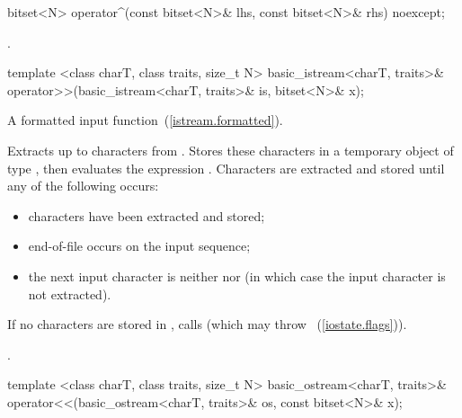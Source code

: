 %
\begin{itemdecl}
bitset<N> operator^(const bitset<N>& lhs, const bitset<N>& rhs) noexcept;
\end{itemdecl}

\begin{itemdescr}
\pnum
\returns
{}.
\end{itemdescr}

%
%
\begin{itemdecl}
template <class charT, class traits, size_t N>
  basic_istream<charT, traits>&
  operator>>(basic_istream<charT, traits>& is, bitset<N>& x);
\end{itemdecl}

\begin{itemdescr}
\pnum
A formatted input function~(\ref{istream.formatted}).

\pnum
\effects
Extracts up to  characters from .
Stores these characters in a temporary object  of type
,
then evaluates the expression
.
Characters are extracted and stored until any of the following occurs:

\begin{itemize}
\item
{} characters have been extracted and stored;
\item
end-of-file occurs on the input sequence;%
\item
the next input character is neither
nor
(in which case the input character is not extracted).
\end{itemize}

\pnum
If no characters are stored in , calls
(which may throw
~(\ref{iostate.flags})).

\pnum
\returns
{}.
\end{itemdescr}

%
%
\begin{itemdecl}
template <class charT, class traits, size_t N>
  basic_ostream<charT, traits>&
  operator<<(basic_ostream<charT, traits>& os, const bitset<N>& x);
\end{itemdecl}

